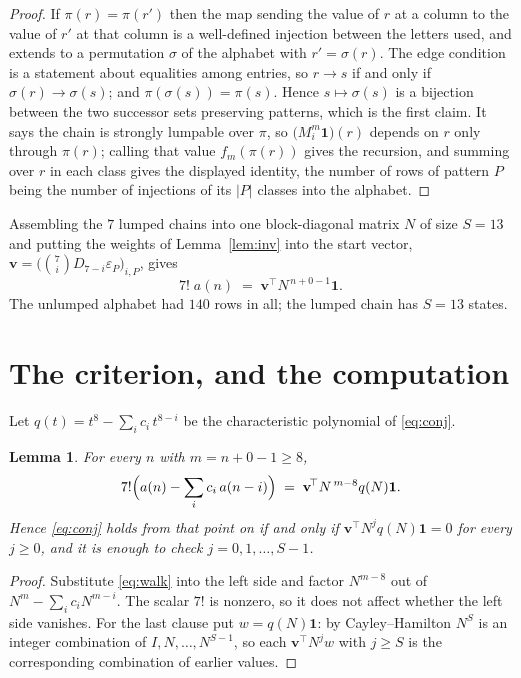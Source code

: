 \documentclass[11pt,a4paper]{article}
\theoremstyle{plain}
\newtheorem{lemma}[theorem]{Lemma}
\theoremstyle{definition}
\begin{document}
\begin{proof}
If $\pi(r)=\pi(r')$ then the map sending the value of $r$ at a column to the value of $r'$
at that column is a well-defined injection between the letters used, and extends to a
permutation $\sigma$ of the alphabet with $r'=\sigma(r)$. The edge condition is a statement
about equalities among entries, so $r\to s$ if and only if $\sigma(r)\to\sigma(s)$; and
$\pi(\sigma(s))=\pi(s)$. Hence $s\mapsto\sigma(s)$ is a bijection between the two successor
sets preserving patterns, which is the first claim. It says the chain is strongly lumpable
over $\pi$, so $\bigl(M_i^{m}\mathbf{1}\bigr)(r)$ depends on $r$ only through $\pi(r)$;
calling that value $f_m(\pi(r))$ gives the recursion, and summing over $r$ in each class
gives the displayed identity, the number of rows of pattern $P$ being the number of
injections of its $|P|$ classes into the alphabet.
\end{proof}

Assembling the $7$ lumped chains into one block-diagonal matrix $N$ of size $S=13$ and
putting the weights of Lemma~\ref{lem:inv} into the start vector,
$\mathbf{v}=\bigl(\binom{7}{i}D_{7-i}\varepsilon_P\bigr)_{i,P}$, gives
\begin{equation}\label{eq:walk}
7!\;a(n)\;=\;\mathbf{v}^{\!\top}N^{\,n+0-1}\mathbf{1} .
\end{equation}
The unlumped alphabet had $140$ rows in all; the lumped chain has $S=13$ states.

\section{The criterion, and the computation}

Let $q(t)=t^{8}-\sum_i c_i\,t^{8-i}$ be the characteristic polynomial of
\eqref{eq:conj}.

\begin{lemma}\label{lem:crit}
For every $n$ with $m=n+0-1\ge8$,
\[
7!\Bigl(a(n)-\sum_i c_i\,a(n-i)\Bigr)\;=\;\mathbf{v}^{\!\top}N^{\,m-8}q(N)\mathbf{1} .
\]
Hence \eqref{eq:conj} holds from that point on if and only if
$\mathbf{v}^{\!\top}N^{j}q(N)\mathbf{1}=0$ for every $j\ge0$, and it is enough to check
$j=0,1,\dots,S-1$.
\end{lemma}

\begin{proof}
Substitute \eqref{eq:walk} into the left side and factor $N^{m-8}$ out of
$N^{m}-\sum_i c_iN^{m-i}$. The scalar $7!$ is nonzero, so it does not affect whether
the left side vanishes. For the last clause put $w=q(N)\mathbf{1}$: by Cayley--Hamilton
$N^{S}$ is an integer combination of $I,N,\dots,N^{S-1}$, so each
$\mathbf{v}^{\!\top}N^{j}w$ with $j\ge S$ is the corresponding combination of earlier
values.
\end{proof}
\end{document}
